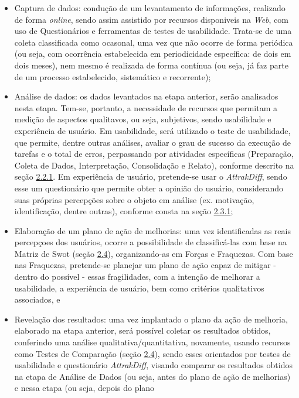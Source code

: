 \begin{itemize}
	\item Captura de dados: condução de um levantamento de informações, realizado de forma \textit{online}, sendo assim assistido por recursos disponiveis na \textit{Web}, com uso de Questionários e ferramentas de testes de usabilidade. Trata-se de uma coleta classificada como ocasonal, uma vez que não ocorre de forma periódica (ou seja, com ocorrência estabelecida em periodicidade específica: de dois em dois meses), nem mesmo é realizada de forma contínua (ou seja, já faz parte de um processo estabelecido, sistemático e recorrente);
	\item Análise de dados: os dados levantados na etapa anterior, serão analisados nesta etapa. Tem-se, portanto, a necessidade de recursos que permitam a medição de aspectos qualitavos, ou seja, subjetivos, sendo usabilidade e experiência de usuário. Em usabilidade, será utilizado o teste de usabilidade, que permite, dentre outras análises, avaliar o grau de sucesso da execução de tarefas e o total de erros, perpassando por atividades específicas (Preparação, Coleta de Dados, Interpretação, Consolidação e Relato), conforme 
	descrito na seção \hyperref[sec:Medição1]{2.2.1}. Em experiência de usuário, pretende-se usar o \textit{AttrakDiff}, sendo esse um questionário que permite obter a opinião do usuário, considerando suas próprias percepções sobre o objeto em análise (ex. motivação, identificação, dentre outras), conforme consta na seção \hyperref[sec:Experiencia de Usuario]{2.3.1};
	\item Elaboração de um plano de ação de melhorias: uma vez identificadas as reais percepçoes dos usuários, ocorre a possibilidade de classificá-las com base na Matriz de Swot (seção \hyperref[sec:Teste de Comparação]{2.4}), organizando-as em Forças e Fraquezas. Com base nas Fraquezas, pretende-se planejar um plano de ação capaz de mitigar - dentro do possível - essas fragilidades, com a intenção de melhorar a usabilidade, a experiência de usuário, bem como critérios qualitativos associados, e
	\item Revelação dos resultados: uma vez implantado o plano da ação de melhoria, elaborado na etapa anterior, será possível coletar os resultados obtidos, conferindo uma análise qualitativa/quantitativa, novamente, usando recursos como Testes de Comparação (seção \hyperref[sec:Teste de Comparação]{2.4}), sendo esses orientados por testes de usabilidade e questionário \textit{AttrakDiff}, visando comparar os resultados obtidos na etapa de Análise de Dados (ou seja, antes do plano de ação de melhorias) e nessa etapa (ou seja, depois do plano 

\end{itemize}
